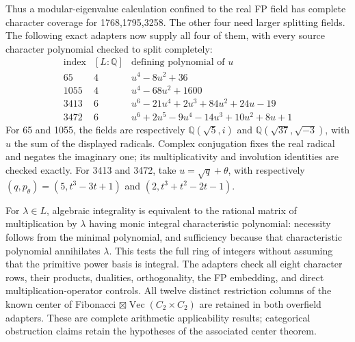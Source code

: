 Thus a modular-eigenvalue calculation confined to the real FP field has
complete character coverage for 1768,1795,3258. The other four need larger
splitting fields. The following exact adapters now supply all four of
them, with every source character polynomial checked to split completely:
\[
\begin{array}{c|c|l}
\text{index}&[L:\mathbb Q]&\text{defining polynomial of }u\\\hline
65&4&u^4-8u^2+36\\
1055&4&u^4-68u^2+1600\\
3413&6&u^6-21u^4+2u^3+84u^2+24u-19\\
3472&6&u^6+2u^5-9u^4-14u^3+10u^2+8u+1
\end{array}
\]
For 65 and 1055, the fields are respectively
$\mathbb Q(\sqrt5,i)$ and $\mathbb Q(\sqrt{37},\sqrt{-3})$, with
$u$ the sum of the displayed radicals. Complex conjugation fixes the
real radical and negates the imaginary one; its multiplicativity and
involution identities are checked exactly. For 3413 and 3472, take
$u=\sqrt q+\theta$, with respectively
$(q,p_\theta)=(5,t^3-3t+1)$ and $(2,t^3+t^2-2t-1)$.

For $\lambda\in L$, algebraic integrality is equivalent to the rational
matrix of multiplication by $\lambda$ having monic integral characteristic
polynomial: necessity follows from the minimal polynomial, and sufficiency
because that characteristic polynomial annihilates $\lambda$.
This tests the full ring of integers without assuming that the primitive
power basis is integral. The adapters check all eight character rows,
their products, dualities, orthogonality, the FP embedding, and direct
multiplication-operator controls. All twelve distinct restriction columns
of the known center of Fibonacci $\boxtimes\operatorname{Vec}(C_2\times C_2)$
are retained in both overfield adapters. These are complete arithmetic
applicability results; categorical obstruction claims retain the
hypotheses of the associated center theorem.

